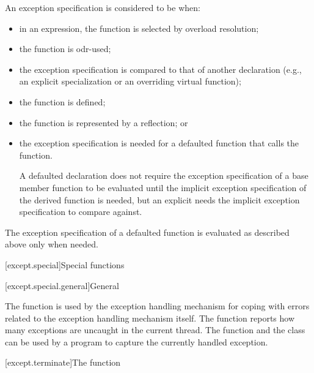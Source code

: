\pnum
An exception specification is considered to be  when:
\begin{itemize}
\item in an expression, the function is selected by
overload resolution;

\item the function is odr-used;

\item the exception specification is compared to that of another
declaration (e.g., an explicit specialization or an overriding virtual
function);

\item the function is defined;

\item the function is represented by a reflection; or

\item the exception specification is needed for a defaulted
function that calls the function.
\begin{note}
A defaulted declaration does not require the
exception specification of a base member function to be evaluated
until the implicit exception specification of the derived
function is needed, but an explicit  needs
the implicit exception specification to compare against.
\end{note}
\end{itemize}
The exception specification of a defaulted
function is evaluated as described above only when needed.
%

[except.special]{Special functions}

[except.special.general]{General}

\pnum
The function 
is used by the exception
handling mechanism for coping with errors related to the exception handling
mechanism itself.
The function 
reports how many exceptions are uncaught in the current thread.
The function  and the class
 can be used by a program to
capture the currently handled exception.

[except.terminate]{The  function}

